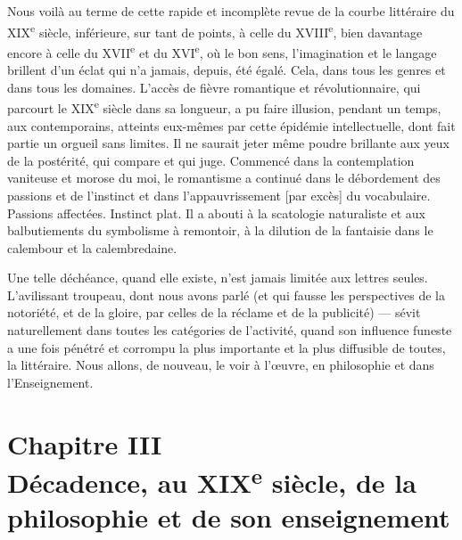 \documentclass[french,twoside]{book} %
\newcommand\chapteropen{} %
\newcommand\chapterclose{} %
\renewcommand\chapteropen{} %
\renewcommand\chapterclose{} %
\begin{document}
Nous voilà au terme de cette rapide et incomplète revue de la courbe littéraire du XIX\textsuperscript{e} siècle, inférieure, sur tant de points, à celle du XVIII\textsuperscript{e}, bien davantage encore à celle du XVII\textsuperscript{e} et du XVI\textsuperscript{e}, où le bon sens, l’imagination et le langage brillent d’un éclat qui n’a jamais, depuis, été égalé. Cela, dans tous les genres et dans tous les domaines. L’accès de fièvre romantique et révolutionnaire, qui parcourt le XIX\textsuperscript{e} siècle dans sa longueur, a pu faire illusion, pendant un temps, aux contemporains, atteints eux-mêmes par cette épidémie intellectuelle, dont fait partie un orgueil sans limites. Il ne saurait jeter même poudre brillante aux yeux de la postérité, qui compare et qui juge. Commencé dans la contemplation vaniteuse et morose du moi, le romantisme a continué dans le débordement des passions et de l’instinct et dans l’appauvrissement [par excès] du vocabulaire. Passions affectées. Instinct plat. Il a abouti à la scatologie naturaliste et aux balbutiements du symbolisme à remontoir, à la dilution de la fantaisie dans le calembour et la calembredaine.\par
Une telle déchéance, quand elle existe, n’est jamais limitée aux lettres seules. L’avilissant troupeau, dont nous avons parlé (et qui fausse les perspectives de la notoriété, et de la gloire, par celles de la réclame et de la publicité) — sévit naturellement dans toutes les catégories de l’activité, quand son influence funeste a une fois pénétré et corrompu la plus importante et la plus diffusible de toutes, la littéraire. Nous allons, de nouveau, le voir à l’œuvre, en philosophie et dans l’Enseignement.
\chapterclose


\chapteropen
\chapter[Chapitre III. Décadence, au XIXe siècle, de la philosophie et de son enseignement]{Chapitre III{\hskip1pt}\\{}Décadence, au XIX\textsuperscript{e} siècle, de la philosophie et de son enseignement}
\end{document}
